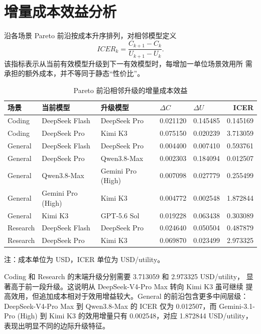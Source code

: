 \documentclass[UTF8,a4paper,11pt]{ctexart}
\begin{document}
\section{增量成本效益分析}

沿各场景 Pareto 前沿按成本升序排列，对相邻模型定义
\[
ICER_k=
\frac{C_{k+1}-C_k}{U_{k+1}-U_k}.
\]
该指标表示从当前有效模型升级到下一有效模型时，每增加一单位场景效用所
需承担的额外成本，并不等同于静态“性价比”。

\begin{table}[htbp]
\centering
\caption{Pareto 前沿相邻升级的增量成本效益}
\label{tab:icer}
\small
\begin{tabularx}{\textwidth}{lYYYYr}
\toprule
场景 & 当前模型 & 升级模型 & $\Delta C$ & $\Delta U$ & ICER\\
\midrule
Coding & DeepSeek Flash & DeepSeek Pro & 0.021120 & 0.145485 & 0.145169\\
Coding & DeepSeek Pro & Kimi K3 & 0.075150 & 0.020239 & 3.713059\\
General & DeepSeek Flash & DeepSeek Pro & 0.004400 & 0.007410 & 0.593761\\
General & DeepSeek Pro & Qwen3.8-Max & 0.002303 & 0.184094 & 0.012507\\
General & Qwen3.8-Max & Gemini Pro (High) & 0.007098 & 0.027779 & 0.255499\\
General & Gemini Pro (High) & Kimi K3 & 0.004772 & 0.002548 & 1.872844\\
General & Kimi K3 & GPT-5.6 Sol & 0.019228 & 0.063438 & 0.303089\\
Research & DeepSeek Flash & DeepSeek Pro & 0.024640 & 0.050504 & 0.487879\\
Research & DeepSeek Pro & Kimi K3 & 0.069870 & 0.023499 & 2.973325\\
\bottomrule
\end{tabularx}

\vspace{0.3em}
\footnotesize 注：成本单位为 USD，ICER 单位为 USD/utility。
\end{table}

Coding 和 Research 的末端升级分别需要 3.713059 和 2.973325 USD/utility，
显著高于前一段升级。这说明从 DeepSeek-V4-Pro Max 转向 Kimi K3 虽可继续
提高效用，但追加成本相对于效用增益较大。General 的前沿包含更多中间层级：
DeepSeek-V4-Pro Max 到 Qwen3.8-Max 的 ICER 仅为 0.012507，而
Gemini-3.1-Pro (High) 到 Kimi K3 的效用增量只有 0.002548，对应
1.872844 USD/utility，表现出明显不同的边际升级特征。
\end{document}
